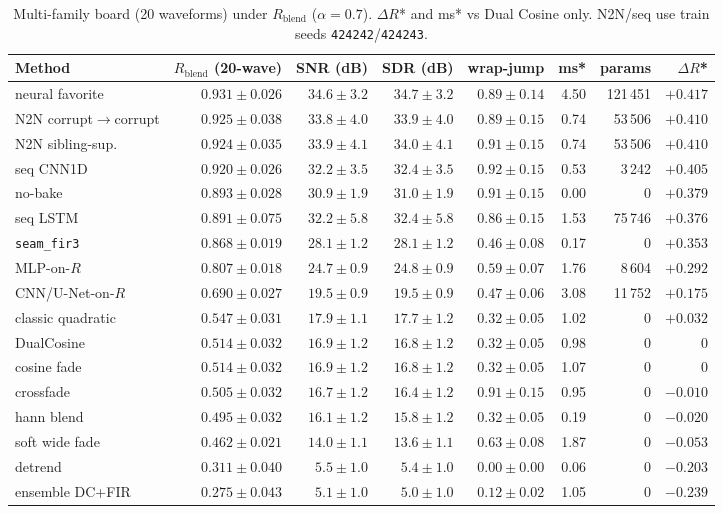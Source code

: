 \begin{table}[t]
  \centering
  \caption{Multi-family board (20 waveforms) under $R_{\mathrm{blend}}$ ($\alpha{=}0.7$).
  $\Delta R$* and ms* vs Dual Cosine only. N2N/seq use train seeds \texttt{424242}/\texttt{424243}.}
  \label{tab:sota-main}
  \setlength{\tabcolsep}{2.2pt}
  \begin{tabular}{@{}lrrrrrrr@{}}
    \toprule
    Method & $R_{\mathrm{blend}}$ (20-wave) & SNR (dB) & SDR (dB) & wrap-jump & ms* & params & $\Delta R$* \\
    \midrule
    neural favorite & $0.931\pm0.026$ & $34.6\pm3.2$ & $34.7\pm3.2$ & $0.89\pm0.14$ & 4.50 & 121\,451 & ${+}0.417$ \\
    N2N corrupt$\to$corrupt & $0.925\pm0.038$ & $33.8\pm4.0$ & $33.9\pm4.0$ & $0.89\pm0.15$ & 0.74 & 53\,506 & ${+}0.410$ \\
    N2N sibling-sup. & $0.924\pm0.035$ & $33.9\pm4.1$ & $34.0\pm4.1$ & $0.91\pm0.15$ & 0.74 & 53\,506 & ${+}0.410$ \\
    seq CNN1D & $0.920\pm0.026$ & $32.2\pm3.5$ & $32.4\pm3.5$ & $0.92\pm0.15$ & 0.53 & 3\,242 & ${+}0.405$ \\
    no-bake & $0.893\pm0.028$ & $30.9\pm1.9$ & $31.0\pm1.9$ & $0.91\pm0.15$ & 0.00 & 0 & ${+}0.379$ \\
    seq LSTM & $0.891\pm0.075$ & $32.2\pm5.8$ & $32.4\pm5.8$ & $0.86\pm0.15$ & 1.53 & 75\,746 & ${+}0.376$ \\
    \texttt{seam\_fir3} & $0.868\pm0.019$ & $28.1\pm1.2$ & $28.1\pm1.2$ & $0.46\pm0.08$ & 0.17 & 0 & ${+}0.353$ \\
    MLP-on-$R$ & $0.807\pm0.018$ & $24.7\pm0.9$ & $24.8\pm0.9$ & $0.59\pm0.07$ & 1.76 & 8\,604 & ${+}0.292$ \\
    CNN/U-Net-on-$R$ & $0.690\pm0.027$ & $19.5\pm0.9$ & $19.5\pm0.9$ & $0.47\pm0.06$ & 3.08 & 11\,752 & ${+}0.175$ \\
    classic quadratic & $0.547\pm0.031$ & $17.9\pm1.1$ & $17.7\pm1.2$ & $0.32\pm0.05$ & 1.02 & 0 & ${+}0.032$ \\
    DualCosine & $0.514\pm0.032$ & $16.9\pm1.2$ & $16.8\pm1.2$ & $0.32\pm0.05$ & 0.98 & 0 & $0$ \\
    cosine fade & $0.514\pm0.032$ & $16.9\pm1.2$ & $16.8\pm1.2$ & $0.32\pm0.05$ & 1.07 & 0 & $0$ \\
    crossfade & $0.505\pm0.032$ & $16.7\pm1.2$ & $16.4\pm1.2$ & $0.91\pm0.15$ & 0.95 & 0 & ${-}0.010$ \\
    hann blend & $0.495\pm0.032$ & $16.1\pm1.2$ & $15.8\pm1.2$ & $0.32\pm0.05$ & 0.19 & 0 & ${-}0.020$ \\
    soft wide fade & $0.462\pm0.021$ & $14.0\pm1.1$ & $13.6\pm1.1$ & $0.63\pm0.08$ & 1.87 & 0 & ${-}0.053$ \\
    detrend & $0.311\pm0.040$ & $5.5\pm1.0$ & $5.4\pm1.0$ & $0.00\pm0.00$ & 0.06 & 0 & ${-}0.203$ \\
    ensemble DC+FIR & $0.275\pm0.043$ & $5.1\pm1.0$ & $5.0\pm1.0$ & $0.12\pm0.02$ & 1.05 & 0 & ${-}0.239$ \\
    \bottomrule
  \end{tabular}
\end{table}

